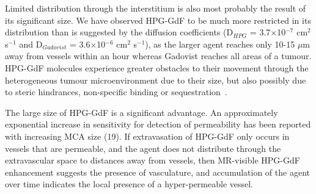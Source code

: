 Limited distribution through the interstitium is also most probably the result of its significant size.
We have observed \acs{HPG-GdF} to be much more restricted in its distribution than is suggested by the diffusion coefficients (D$_{HPG}$ = 3.7$\times$10$^{-7}$ cm$^2$ s$^{-1}$ and D$_{Gadovist}$ = 3.6$\times$10$^{-6}$ cm$^2$ s$^{-1}$), as the larger agent reaches only 10-15 $\mu$m away from vessels within an hour whereas Gadovist reaches all areas of a tumour.
\acs{HPG-GdF} molecules experience greater obstacles to their movement through the heterogeneous tumour microenvironment due to their size, but also possibly due to steric hindrances, non-specific binding or sequestration~\cite{Minchinton:2006gs}.

The large size of \acs{HPG-GdF} is a significant advantage.
An approximately exponential increase in sensitivity for detection of permeability has been reported with increasing MCA size (19).
If extravasation of \acs{HPG-GdF} only occurs in vessels that are permeable, and the agent does not distribute through the extravascular space to distances away from vessels, then MR-visible \acs{HPG-GdF} enhancement suggests the presence of vasculature, and accumulation of the agent over time indicates the local presence of a hyper-permeable vessel.

